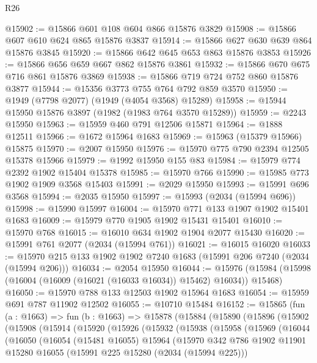 \begin{lexlean}{R26}
\begin{coremodule}
@15902 := @15866 @601 @108 @604 @866 @15876 @3829
@15908 := @15866 @607 @610 @624 @865 @15876 @3837
@15914 := @15866 @627 @630 @639 @864 @15876 @3845
@15920 := @15866 @642 @645 @653 @863 @15876 @3853
@15926 := @15866 @656 @659 @667 @862 @15876 @3861
@15932 := @15866 @670 @675 @716 @861 @15876 @3869
@15938 := @15866 @719 @724 @752 @860 @15876 @3877
@15944 := @15356 @3773 @755 @764 @792 @859 @3570
@15950 := @1949 (@7798 @2077) (@1949 (@4054 @3568) @15289)
@15958 := @15944 @15950 @15876 @3897 (@1982 (@1983 @764 @3570 @15289))
@15959 := @2243 @15950
@15963 := @15959 @460 @791 @12506 @15871
@15964 := @1888 @12511
@15966 := @1672 @15964 @1683
@15969 := @15963 (@15379 @15966) @15875
@15970 := @2007 @15950
@15976 := @15970 @775 @790 @2394 @12505 @15378 @15966
@15979 := @1992 @15950 @155 @83
@15984 := @15979 @774 @2392 @1902 @15404 @15378
@15985 := @15970 @766
@15990 := @15985 @773 @1902 @1909 @3568 @15403
@15991 := @2029 @15950
@15993 := @15991 @696 @3568
@15994 := @2035 @15950
@15997 := @15993 (@2034 (@15994 @696))
@15998 := @15990 @15997
@16004 := @15970 @771 @133 @1907 @1902 @15401 @1683
@16009 := @15979 @770 @1905 @1902 @15431 @15401
@16010 := @15970 @768
@16015 := @16010 @634 @1902 @1904 @2077 @15430
@16020 := @15991 @761 @2077 (@2034 (@15994 @761))
@16021 := @16015 @16020
@16033 := @15970 @215 @133 @1902 @1902 @7240 @1683 (@15991 @206 @7240 (@2034 (@15994 @206)))
@16034 := @2054 @15950
@16044 := @15976 (@15984 (@15998 (@16004 (@16009 (@16021 (@16033 @16034)) @15462) @16034)) @15468)
@16050 := @15970 @788 @133 @12503 @1902 @15964 @1683
@16054 := @15959 @691 @787 @11902 @12502
@16055 := @10710 @15484
@16152 := @15865
    (fun (a : @1663) =>
    fun (b : @1663) =>
    @15878
      (@15884
        (@15890
          (@15896
            (@15902
              (@15908
                (@15914
                  (@15920
                    (@15926
                      (@15932
                        (@15938
                          (@15958
                            (@15969
                              (@16044
                                (@16050
                                  (@16054
                                    (@15481 @16055)
                                    @15964
                                    (@15970
                                      @342
                                      @786
                                      @1902
                                      @11901
                                      @15280
                                      @16055
                                      (@15991 @225 @15280 (@2034 (@15994 @225)))

\end{coremodule}
\end{lexlean}
